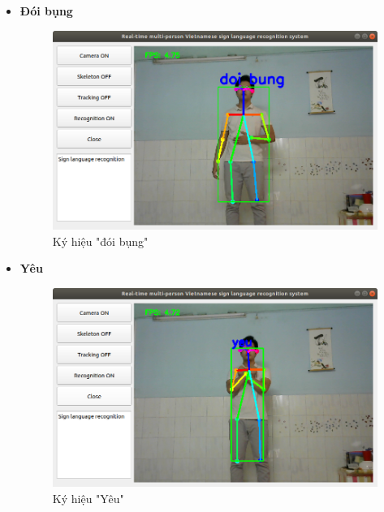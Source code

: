 \documentclass[12pt,a4paper,oneside]{book}
\numberwithin{equation}{chapter} %
\numberwithin{figure}{chapter} %
\numberwithin{table}{chapter} %
\begin{document}
\begin{itemize}
\item \textbf{Đói bụng}
\FloatBarrier
\begin{figure}[htp]
\begin{center}
\includegraphics[scale=0.4]{kq/doi_bung.png}
\end{center}
\caption{Ký hiệu "đói bụng"}
\end{figure}
\FloatBarrier

\item \textbf{Yêu}
\FloatBarrier
\begin{figure}[htp]
\begin{center}
\includegraphics[scale=0.4]{kq/yeu.png}
\end{center}
\caption{Ký hiệu "Yêu"}
\end{figure}
\FloatBarrier

\thispagestyle{phuluc}
\pagebreak


\end{itemize}
\end{document}
